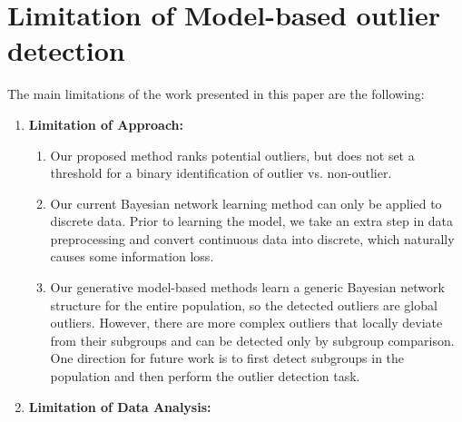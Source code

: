 {\section{Limitation of Model-based outlier detection} 

The main limitations of the work presented in this paper are the following:
\begin{enumerate}
	\item \textbf{Limitation of Approach:} 
	\begin{enumerate}\item Our proposed method ranks potential outliers, but does not set a threshold for a binary identification of outlier vs. non-outlier.
		\item Our current Bayesian network learning method can only be applied to discrete data. Prior to learning the model, we take an extra step in data preprocessing and convert continuous data into discrete, which naturally causes some information loss. \item Our generative model-based methods learn a generic Bayesian network structure for the entire population, so the detected outliers are global outliers. However, there are  more complex outliers that locally deviate from their subgroups and can be detected only by subgroup comparison. One direction for future work is to first detect subgroups in the population and then perform the outlier detection task.
	\end{enumerate}
	\item \textbf{Limitation of Data Analysis: }
	

\end{enumerate}}
